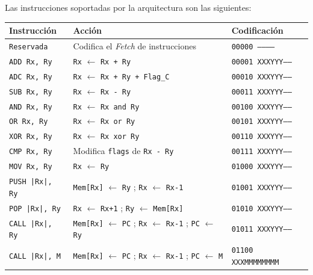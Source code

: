 \documentclass[a4paper,11pt]{article}
\begin{document}
\noindent Las instrucciones soportadas por la arquitectura son las siguientes:

\begin{center}
\begin{tabular}{l|l|l}
Instrucción            & Acción                                                             & Codificación               \\
\hline
\texttt{Reservada}     & Codifica el \emph{Fetch} de instrucciones                          & \texttt{00000 -----------} \\  %
\texttt{ADD  Rx, Ry}   & \texttt{Rx} $\leftarrow$ \texttt{Rx + Ry}                          & \texttt{00001 XXXYYY-----} \\  %
\texttt{ADC  Rx, Ry}   & \texttt{Rx} $\leftarrow$ \texttt{Rx + Ry + Flag\_C}                & \texttt{00010 XXXYYY-----} \\  %
\texttt{SUB  Rx, Ry}   & \texttt{Rx} $\leftarrow$ \texttt{Rx - Ry}                          & \texttt{00011 XXXYYY-----} \\  %
\texttt{AND  Rx, Ry}   & \texttt{Rx} $\leftarrow$ \texttt{Rx and Ry}                        & \texttt{00100 XXXYYY-----} \\  %
\texttt{OR   Rx, Ry}   & \texttt{Rx} $\leftarrow$ \texttt{Rx or Ry}                         & \texttt{00101 XXXYYY-----} \\  %
\texttt{XOR  Rx, Ry}   & \texttt{Rx} $\leftarrow$ \texttt{Rx xor Ry}                        & \texttt{00110 XXXYYY-----} \\  %
\texttt{CMP  Rx, Ry}   & Modifica \texttt{flags} de \texttt{Rx - Ry}                        & \texttt{00111 XXXYYY-----} \\  %
\texttt{MOV  Rx, Ry}   & \texttt{Rx} $\leftarrow$ \texttt{Ry}                               & \texttt{01000 XXXYYY-----} \\  %
\hline
\texttt{PUSH |Rx|, Ry} & \texttt{Mem[Rx]} $\leftarrow$ \texttt{Ry} ; \texttt{Rx} $\leftarrow$ \texttt{Rx-1}    & \texttt{01001 XXXYYY-----} \\  %
\texttt{POP  |Rx|, Ry} & \texttt{Rx} $\leftarrow$ \texttt{Rx+1} ; \texttt{Ry} $\leftarrow$ \texttt{Mem[Rx]}    & \texttt{01010 XXXYYY-----} \\  %
\texttt{CALL |Rx|, Ry} & \texttt{Mem[Rx]} $\leftarrow$ \texttt{PC} ; \texttt{Rx} $\leftarrow$ \texttt{Rx-1} ; \texttt{PC} $\leftarrow$ \texttt{Ry}  & \texttt{01011 XXXYYY-----} \\  %
\texttt{CALL |Rx|, M}  & \texttt{Mem[Rx]} $\leftarrow$ \texttt{PC} ; \texttt{Rx} $\leftarrow$ \texttt{Rx-1} ; \texttt{PC} $\leftarrow$ \texttt{M}   & \texttt{01100 XXXMMMMMMMM} \\  %

\end{tabular}
\end{center}
\end{document}
